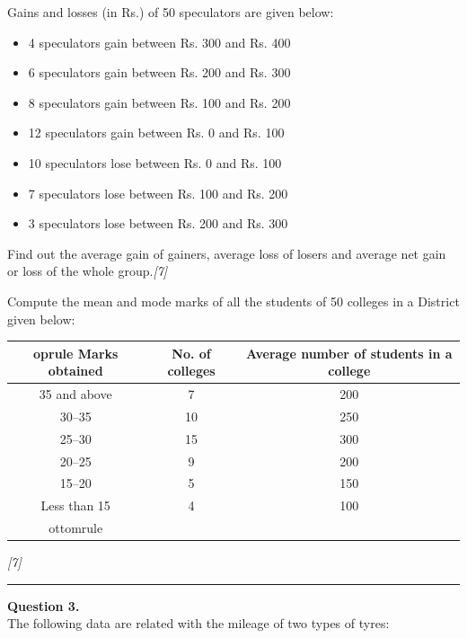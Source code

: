 \documentclass[11pt,a4paper]{article}
\newcommand{\pts}[1]{\hfill   \textit{[#1]}}
\begin{document}
\begin{parts}
  \item Gains and losses (in Rs.) of 50 speculators are given below:
  
\begin{itemize}
    \item 4 speculators gain between Rs. 300 and Rs. 400
    \item 6 speculators gain between Rs. 200 and Rs. 300
    \item 8 speculators gain between Rs. 100 and Rs. 200
    \item 12 speculators gain between Rs. 0 and Rs. 100
    \item 10 speculators lose between Rs. 0 and Rs. 100
    \item 7 speculators lose between Rs. 100 and Rs. 200
    \item 3 speculators lose between Rs. 200 and Rs. 300
  \end{itemize}
  Find out the average gain of gainers, average loss of losers and average net gain or loss of the whole group.\pts{7}
  
  \item Compute the mean and mode marks of all the students of 50 colleges in a District given below:
  
\begin{center}
    \small
    
\begin{tabular}{ccc}
       oprule
   \textbf{Marks obtained} &   \textbf{No. of colleges} &   \textbf{Average number of students in a college} \\
      \midrule
      35 and above & 7 & 200 \\
      30--35 & 10 & 250 \\
      25--30 & 15 & 300 \\
      20--25 & 9 & 200 \\
      15--20 & 5 & 150 \\
      Less than 15 & 4 & 100 \\
      ottomrule
    \end{tabular}
  \end{center}\pts{7}
\end{parts}

\medskip\rule{\linewidth}{0.2pt}




\noindent   \textbf{Question 3.} \\
The following data are related with the mileage of two types of tyres:
\end{document}
